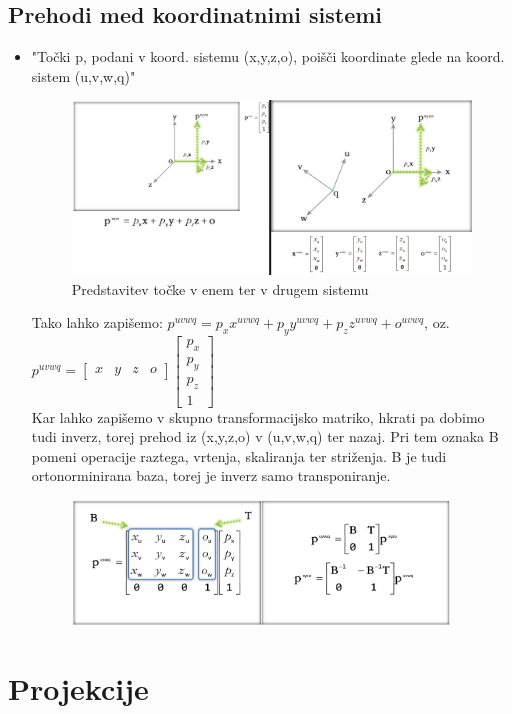 \documentclass{article}
\begin{document}
\subsection{Prehodi med koordinatnimi sistemi}
\begin{itemize}
    \item "Točki p, podani v koord. sistemu (x,y,z,o), poišči koordinate glede na koord. sistem (u,v,w,q)"
        \begin{figure}[H]
        \centering
        \includegraphics[width=150mm]{src/prehajanje_koord_sistemov_1.png}
        \caption{Predstavitev točke v enem ter v drugem sistemu}
        \end{figure} 
    Tako lahko zapišemo: $p^{uvwq} = p_xx^{uvwq} + p_yy^{uvwq} + p_zz^{uvwq} + o^{uvwq}$, oz. $p^{uvwq} = \begin{bmatrix} x & y & z & o \end{bmatrix} \begin{bmatrix} p_x \\ p_y \\ p_z \\ 1 \end{bmatrix}$ \\
    Kar lahko zapišemo v skupno transformacijsko matriko, hkrati pa dobimo tudi inverz, torej prehod iz (x,y,z,o) v (u,v,w,q) ter nazaj. Pri tem oznaka B pomeni operacije raztega, vrtenja, skaliranja ter striženja. B je tudi ortonorminirana baza, torej je inverz samo transponiranje.
        \begin{figure}[H]
        \centering
        \includegraphics[width=100mm]{src/prehajanje_koord_sistemov_2.png}
        \end{figure} 
\end{itemize}

\section{Projekcije}
\end{document}
